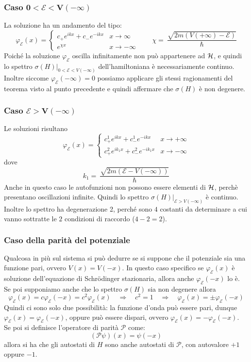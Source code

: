 \documentclass[../../FisicaTeorica.tex]{subfiles}
\begin{document}
\subsubsection{Caso $\bm{0 < \mathcal{E} < V(-\infty)}$}
La soluzione ha un andamento del tipo:
\[
\varphi_\mathcal{E}(x) = \begin{cases}
c_+ e^{ikx} + c_-e^{-ikx} & x\to\infty\\
e^{\chi x} & x\to-\infty
\end{cases} \qquad \chi =\ \frac{\sqrt{2m(V(+\infty)-\mathcal{E})}}{\hbar}
\]
Poiché la soluzione $\varphi_{\mathcal E}$ oscilla infinitamente non può appartenere ad $\mathcal{H}$, e quindi lo spettro $\sigma(H)|_{0<\mathcal{E}<V(-\infty)}$ dell'hamiltoniana è necessariamente continuo.
Inoltre siccome $\varphi_\mathcal{E}(-\infty) = 0$ possiamo applicare gli stessi ragionamenti del teorema visto al punto precedente e quindi affermare che $\sigma(H)$ è non degenere.

\subsubsection{Caso $\bm{\mathcal{E} > V(-\infty)}$}
Le soluzioni risultano
\[
\varphi_\mathcal{E}(x) = \begin{cases}
c^1_+ e^{ikx} + c^1_- e^{-ikx} & x\to +\infty\\
c^2_+ e^{ik_1 x} + c^2_- e^{-ik_1 x} & x\to -\infty
\end{cases}
\]
dove
\[
k_1 =\ \frac{\sqrt{2m(\mathcal{E}-V(-\infty))}}{\hbar}
\]
Anche in questo caso le autofunzioni non possono essere elementi di $\mathcal{H}$, perchè presentano oscillazioni infinite. Quindi lo spettro $\sigma(H)|_{\mathcal{E}>V(-\infty)}$ è continuo. Inoltre lo spettro ha degenerazione 2, perché sono $4$ costanti da determinare a cui vanno sottratte le $2$ condizioni di raccordo ($4 - 2 = 2$).

\subsubsection{Caso della parità del potenziale}
Qualcosa in più sul sistema si può dedurre se si suppone che il potenziale sia una funzione pari, ovvero $V(x) = V(-x)$. In questo caso specifico se $\varphi_\mathcal{E}(x)$ è soluzione dell'equazione di Schrödinger stazionaria, allora anche $\varphi_\mathcal{E}(-x)$ lo è. Se poi supponiamo anche che lo spettro $\sigma(H)$ sia non degenere allora
\[\varphi_\mathcal{E}(x)=c \varphi_\mathcal{E}(-x) = c^2\varphi_\mathcal{E}(x) \quad \Rightarrow \quad c^2 = 1 \quad \Rightarrow \quad \varphi_{\mathcal E}(x) = \pm \varphi_{\mathcal E}(-x)
\]
Quindi ci sono solo due possibilità: la funzione d'onda può essere pari, dunque $\varphi_\mathcal{E}(x) =\varphi_\mathcal{E}(-x)$, oppure può essere dispari, ovvero $\varphi_\mathcal{E}(x)=-\varphi_\mathcal{E}(-x)$.\\
Se poi si definisce l'operatore di parità $\mathcal{P}$ come:
\[
(\mathcal{P}\psi)(x)=\psi(-x)
\]
allora si ha che gli autostati di $H$ sono anche autostati di $\mathcal{P}$, con autovalore $+1$ oppure $-1$.
\end{document}
